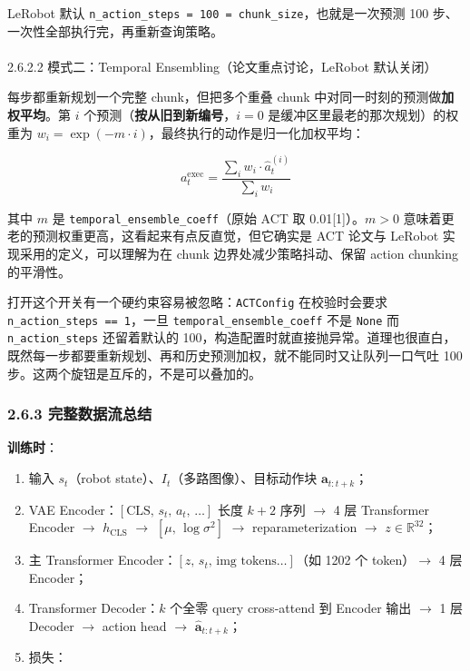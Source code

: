 \documentclass[
  chinese,
]{ctexart}
\makeatletter
\let\oldparagraph\paragraph
\renewcommand{\paragraph}{
    \@ifstar
      \xxxParagraphStar
      \xxxParagraphNoStar
  }
\newcommand{\xxxParagraphStar}[1]{\oldparagraph*{#1}\mbox{}}
\newcommand{\xxxParagraphNoStar}[1]{\oldparagraph{#1}\mbox{}}
\providecommand{\tightlist}{%
  \setlength{\itemsep}{0pt}\setlength{\parskip}{0pt}}
\makeatother
\begin{document}
LeRobot 默认
\texttt{n\_action\_steps\ =\ 100\ =\ chunk\_size}，也就是一次预测 100
步、一次性全部执行完，再重新查询策略。

\paragraph{2.6.2.2 模式二：Temporal Ensembling（论文重点讨论，LeRobot
默认关闭）}\label{ux6a21ux5f0fux4e8ctemporal-ensemblingux8bbaux6587ux91cdux70b9ux8ba8ux8bbalerobot-ux9ed8ux8ba4ux5173ux95ed}

每步都重新规划一个完整 chunk，但把多个重叠 chunk
中对同一时刻的预测做\textbf{加权平均}。第 \(i\)
个预测（\textbf{按从旧到新编号}，\(i=0\)
是缓冲区里最老的那次规划）的权重为
\(w_i = \exp(-m \cdot i)\)，最终执行的动作是归一化加权平均：

\[
a_t^{\text{exec}} = \frac{\sum_{i} w_i \cdot \hat{a}_t^{(i)}}{\sum_{i} w_i}
\]

其中 \(m\) 是 \texttt{temporal\_ensemble\_coeff}（原始 ACT 取
0.01{[}1{]}）。\(m > 0\)
意味着更老的预测权重更高，这看起来有点反直觉，但它确实是 ACT 论文与
LeRobot 实现采用的定义，可以理解为在 chunk 边界处减少策略抖动、保留
action chunking 的平滑性。

打开这个开关有一个硬约束容易被忽略：\texttt{ACTConfig} 在校验时会要求
\texttt{n\_action\_steps\ ==\ 1}，一旦
\texttt{temporal\_ensemble\_coeff} 不是 \texttt{None} 而
\texttt{n\_action\_steps} 还留着默认的
100，构造配置时就直接抛异常。道理也很直白，既然每一步都要重新规划、再和历史预测加权，就不能同时又让队列一口气吐
100 步。这两个旋钮是互斥的，不是可以叠加的。

\subsubsection{2.6.3
完整数据流总结}\label{ux5b8cux6574ux6570ux636eux6d41ux603bux7ed3}

\textbf{训练时}：

\begin{enumerate}
\def\labelenumi{\arabic{enumi}.}
\tightlist
\item
  输入 \(s_t\)（robot state）、\(I_t\)（多路图像）、目标动作块
  \(\mathbf{a}_{t:t+k}\)；
\item
  VAE Encoder：\([\text{CLS},\, s_t,\, a_t,\, \ldots]\) 长度 \(k+2\)
  序列 \(\to\) 4 层 Transformer Encoder \(\to\) \(h_{\text{CLS}}\)
  \(\to\) \([\mu,\, \log\sigma^2]\) \(\to\) reparameterization \(\to\)
  \(z \in \mathbb{R}^{32}\)；
\item
  主 Transformer Encoder：\([z,\, s_t,\, \text{img tokens}\ldots]\)（如
  1202 个 token）\(\to\) 4 层 Encoder；
\item
  Transformer Decoder：\(k\) 个全零 query cross-attend 到 Encoder 输出
  \(\to\) 1 层 Decoder \(\to\) action head \(\to\)
  \(\hat{\mathbf{a}}_{t:t+k}\)；
\item
  损失：
\end{enumerate}
\end{document}
